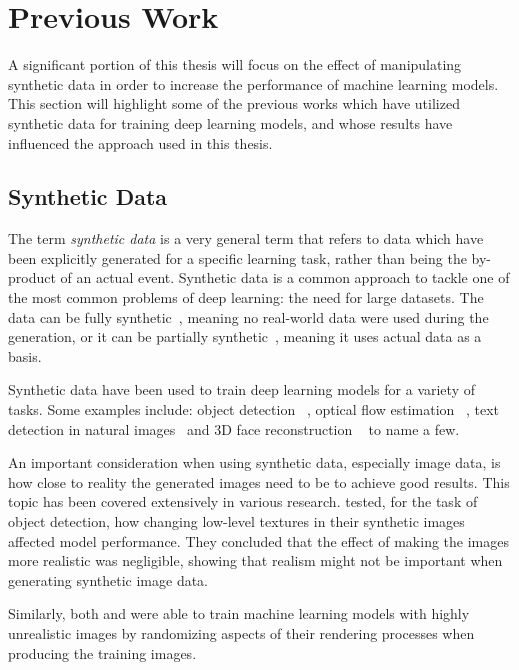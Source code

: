 \section{Previous Work}\label{previous-work}
A significant portion of this thesis will focus on the effect of manipulating synthetic data in order to increase the performance of machine learning models. This section will highlight some of the previous works which have utilized synthetic data for training deep learning models, and whose results have influenced the approach used in this thesis.

\subsection{Synthetic Data}
The term \textit{synthetic data} is a very general term that refers to data which have been explicitly generated for a specific learning task, rather than being the by-product of an actual event. Synthetic data is a common approach to tackle one of the most common problems of deep learning: the need for large datasets. The data can be fully synthetic~\cite{domainrand, domainrandcars, object-detection-synth}, meaning no real-world data were used during the generation, or it can be partially synthetic~\cite{cropandpaste}, meaning it uses actual data as a basis.

Synthetic data have been used to train deep learning models for a variety of tasks. Some examples include: object detection ~\cite{domainrand, cropandpaste, domainrandcars, object-detection-synth}, optical flow estimation ~\cite{flying-chairs}, text detection in natural images~\cite{text-detection} and 3D face reconstruction ~\cite{synth-face} to name a few.

An important consideration when using synthetic data, especially image data, is how close to reality the generated images need to be to achieve good results. This topic has been covered extensively in various research. \textcite{object-detection-synth} tested, for the task of object detection, how changing low-level textures in their synthetic images affected model performance. They concluded that the effect of making the images more realistic was negligible, showing that realism might not be important when generating synthetic image data. 

Similarly, both \textcite{domainrand} and \textcite{domainrandcars} were able to train machine learning models with highly unrealistic images by randomizing aspects of their rendering processes when producing the training images.

